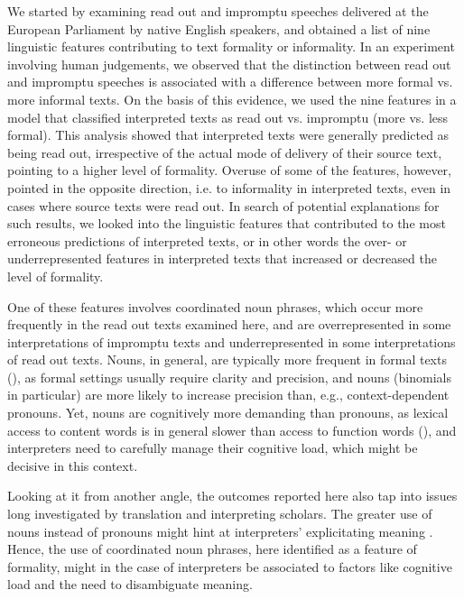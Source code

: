 \documentclass[output=paper]{langscibook}
\begin{document}
\newpage
We started by examining read out and impromptu speeches delivered at the European Parliament by native English speakers, and obtained a list of nine linguistic features contributing to text formality or informality. In an experiment involving human judgements, we observed that the distinction between read out and impromptu speeches is associated with a difference between more formal vs. more informal texts. On the basis of this evidence, we used the nine features in a model that classified interpreted texts as read out vs. impromptu (more vs. less formal). This analysis showed that interpreted texts were generally predicted as being read out, irrespective of the actual mode of delivery of their source text, pointing to a higher level of formality. Overuse of some of the features, however, pointed in the opposite direction, i.e. to informality in interpreted texts, even in cases where source texts were read out. In search of potential explanations for such results, we looked into the linguistic features that contributed to the most erroneous predictions of interpreted texts, or in other words the over- or underrepresented features in interpreted texts that increased or decreased the level of formality.

One of these features involves coordinated noun phrases, which occur more frequently in the read out texts examined here, and are overrepresented in some interpretations of impromptu texts and underrepresented in some interpretations of read out texts. Nouns, in general, are typically more frequent in formal texts (\citealt{HeylighenDewaele1999}), as formal settings usually require clarity and precision, and nouns (binomials in particular) are more likely to increase precision than, e.g., context-dependent pronouns. Yet, nouns are cognitively more demanding than pronouns, as lexical access to content words is in general slower than access to function words (\citealt{SegalowitzLane2000}), and interpreters need to carefully manage their cognitive load, which might be decisive in this context. 

Looking at it from another angle, the outcomes reported here also tap into issues long investigated by translation and interpreting scholars. The greater use of nouns instead of pronouns might hint at interpreters’ explicitating meaning \citep{BlumKulka1986}. Hence, the use of coordinated noun phrases, here identified as a feature of formality, might in the case of interpreters be associated to factors like cognitive load and the need to disambiguate meaning.
\end{document}
